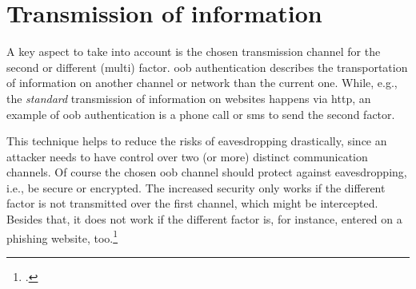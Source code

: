 \section{Transmission of information}

A key aspect to take into account is the chosen transmission channel for the second or different (multi) factor. \gls{oob} authentication describes the transportation of information on another channel or network than the current one. While, e.g., the \textit{standard} transmission of information on websites happens via \gls{http}, an example of \gls{oob} authentication is a phone call or \gls{sms} to send the second factor.

This technique helps to reduce the risks of eavesdropping drastically, since an attacker needs to have control over two (or more) distinct communication channels. Of course the chosen \gls{oob} channel should protect against eavesdropping, i.e., be secure or encrypted. The increased security only works if the different factor is not transmitted over the first channel, which might be intercepted. Besides that, it does not work if the different factor is, for instance, entered on a phishing website, too.\footcites[See][17]{SP80063B}[See][441]{320284}[See][140]{brotherston2017defensive}[See][106]{2241278}